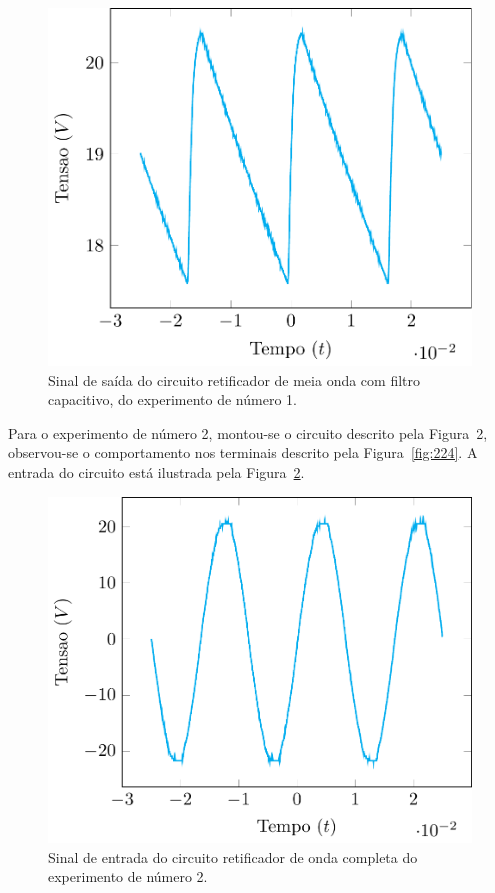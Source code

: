 \documentclass[12pt,a4paper]{article}
\begin{document}
\begin{figure}[htpb]
  \centering
  \includegraphics[width=0.8\linewidth]{222.pdf}
  \caption{Sinal de saída do circuito retificador de meia onda com filtro capacitivo, do experimento de número 1.}
  \label{fig:222}
\end{figure}
Para o experimento de número 2, montou-se o circuito descrito pela Figura~2, observou-se o comportamento nos terminais descrito pela Figura~\ref{fig:224}. A entrada do circuito está ilustrada pela Figura~\ref{fig:223}.
\begin{figure}[htpb]
  \centering
  \includegraphics[width=0.8\linewidth]{223.pdf}
  \caption{Sinal de entrada  do circuito retificador de onda completa do experimento de número 2.}
  \label{fig:223}
\end{figure}
\end{document}
